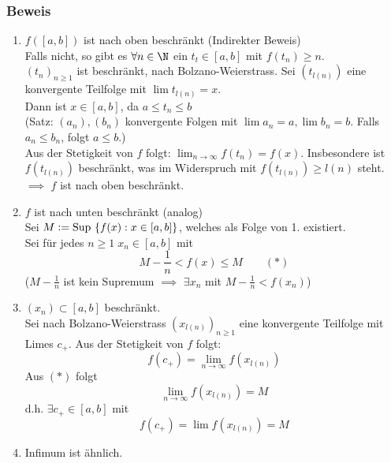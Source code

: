 \subsubsection*{Beweis}
\begin{enumerate}
\item $f([a,b])$ ist nach oben beschränkt (Indirekter Beweis) \\

Falls nicht, so gibt es $\forall n \in \N$ ein $t_{t}\in [a,b]$ mit $f(t_{n}) \geq n$. \\
$(t_{n})_{n\geq 1}$ ist beschränkt, nach Bolzano-Weierstrass. Sei $(t_{l(n)})$ eine konvergente Teilfolge mit $\lim{t_{l(n)}}=x$. \\
Dann ist $x\in [a,b]$, da $a\leq t_{n}\leq b$ \\
(Satz: $(a_{n}), (b_{n})$ konvergente Folgen mit $\lim{a_{n}} = a, \lim{b_{n}} = b$. Falls $a_{n} \leq b_{n}$, folgt $a \leq b$.) \\
Aus der Stetigkeit von $f$ folgt: $\lim_{n\to\infty}{f(t_{n})} = f(x)$. Insbesondere ist $f(t_{l(n)})$ beschränkt, was im Widerspruch mit $f(t_{l(n)})\geq l(n)$ steht. \\

$\implies$ $f$ ist nach oben beschränkt.

\item $f$ ist nach unten beschränkt (analog) \\

Sei $M \vcentcolon= \text{Sup }\{f(x):x\in [a,b]\}$, welches als Folge von 1. existiert. \\
Sei für jedes $n\geq 1\; x_{n}\in [a,b]$ mit \[M-\frac{1}{n} < f(x) \leq M \quad\quad (\ast)\]
($M-\frac{1}{n}$ ist kein Supremum $\implies$ $\exists x_{n}$ mit $M-\frac{1}{n} < f(x_{n})$)\\
\item $(x_{n}) \subset [a,b]$ beschränkt. \\
Sei nach Bolzano-Weierstrass $(x_{l(n)})_{n\geq 1}$ eine konvergente Teilfolge mit Limes $c_{+}$. Aus der Stetigkeit von $f$ folgt: \[ f(c_{+}) = \lim_{n\to\infty}{f(x_{l(n)})}\]
Aus $(\ast)$ folgt
\[ \lim_{n\to\infty}{f(x_{l(n)})} = M\]
d.h. $\exists c_{+} \in [a,b]$ mit \[ f(c_{+}) = \lim{f(x_{l(n)})} = M\]
\item Infimum ist ähnlich.
\end{enumerate}

